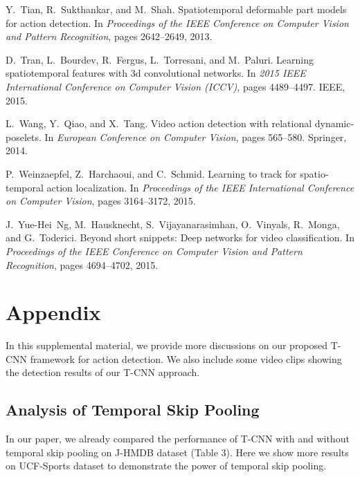 \documentclass[10pt,twocolumn,letterpaper]{article}
\begin{document}
{\begin{thebibliography}{10}
Y.~Tian, R.~Sukthankar, and M.~Shah.
\newblock Spatiotemporal deformable part models for action detection.
\newblock In {\em Proceedings of the IEEE Conference on Computer Vision and
  Pattern Recognition}, pages 2642--2649, 2013.

D.~Tran, L.~Bourdev, R.~Fergus, L.~Torresani, and M.~Paluri.
\newblock Learning spatiotemporal features with 3d convolutional networks.
\newblock In {\em 2015 IEEE International Conference on Computer Vision
  (ICCV)}, pages 4489--4497. IEEE, 2015.

L.~Wang, Y.~Qiao, and X.~Tang.
\newblock Video action detection with relational dynamic-poselets.
\newblock In {\em European Conference on Computer Vision}, pages 565--580.
  Springer, 2014.

P.~Weinzaepfel, Z.~Harchaoui, and C.~Schmid.
\newblock Learning to track for spatio-temporal action localization.
\newblock In {\em Proceedings of the IEEE International Conference on Computer
  Vision}, pages 3164--3172, 2015.

J.~Yue-Hei~Ng, M.~Hausknecht, S.~Vijayanarasimhan, O.~Vinyals, R.~Monga, and
  G.~Toderici.
\newblock Beyond short snippets: Deep networks for video classification.
\newblock In {\em Proceedings of the IEEE Conference on Computer Vision and
  Pattern Recognition}, pages 4694--4702, 2015.

\end{thebibliography}

}



\section{Appendix}
In this supplemental material, we provide more discussions on our proposed T-CNN framework for action detection.
We also include some video clips showing the detection results of our T-CNN approach.



\subsection{Analysis of Temporal Skip Pooling}
In our paper, we already compared the performance of T-CNN with and without temporal skip pooling on J-HMDB dataset (Table 3). Here we show more results on UCF-Sports dataset to demonstrate the power of temporal skip pooling.
\end{document}
